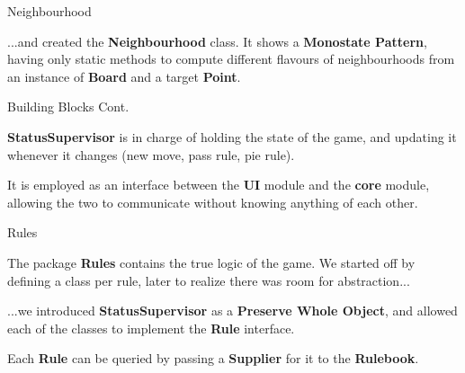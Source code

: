 \documentclass{beamer}
\begin{document}
  \begin{frame} {Neighbourhood}

    ...and created the \textbf{Neighbourhood} class. It shows a \textbf{Monostate Pattern}, having only static methods to compute different flavours of neighbourhoods from an instance of \textbf{Board} and a target \textbf{Point}.

  \end{frame}



  \begin{frame} {Building Blocks Cont.}

    \textbf{StatusSupervisor} is in charge of holding the state of the game, and updating it whenever it changes (new move, pass rule, pie rule).

    \vspace{1em}

    It is employed as an interface between the \textbf{UI} module and the \textbf{core} module, allowing the two to communicate without knowing anything of each other.

  \end{frame}



  \begin{frame} {Rules}

    The package \textbf{Rules} contains the true logic of the game. We started off by defining a class per rule, later to realize there was room for abstraction...

    \vspace{1em}

    ...we introduced \textbf{StatusSupervisor} as a \textbf{Preserve Whole Object}, and allowed each of the classes to implement the \textbf{Rule} interface.

    \vspace{1em}

    Each \textbf{Rule} can be queried by passing a \textbf{Supplier} for it to the \textbf{Rulebook}.

  \end{frame}
\end{document}
